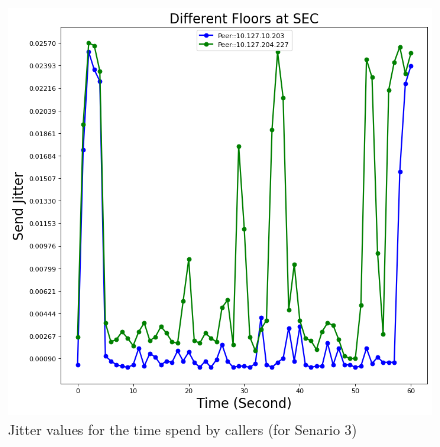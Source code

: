 	\begin{figure}[!t]
		\begin{minipage}{\textwidth}
			\includegraphics[scale=0.38]{Images/experiment/senarios/df_diff_floor.png}
		\end{minipage}
		\caption{Jitter values for the time spend by callers (for Senario 3)}
		\label{fig:scene-out-3}
	\end{figure}


